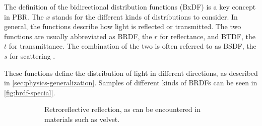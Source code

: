 The definition of the bidirectional distribution functions (\gls{BxDF}) is a key concept in \gls{PBR}. The $x$ stands for the different kinds of distributions to consider. In general, the functions describe how light is reflected or transmitted. The two functions are usually abbreviated as \gls{BRDF}, the $r$ for reflectance, and \gls{BTDF}, the $t$ for transmittance. The combination of the two is often referred to as \gls{BSDF}, the $s$ for scattering \cite{Pharr_Physically_Based_Rendering_2023}.

These functions define the distribution of light in different directions, as described in \autoref{sec:physics-generalization}. Samples of different kinds of \glspl{BRDF} can be seen in \autoref{fig:brdf-special}.

\begin{figure}[H]
  \centering
  \begin{subfigure}[t]{0.45\textwidth}
    \centering
    \caption{Retroreflective reflection, as can be encountered in materials such as velvet.}
    \label{fig:reflectionRetroreflective}
  \end{subfigure}
  \hfill
  \begin{subfigure}[t]{0.45\textwidth}
    \centering
\end{subfigure}
\end{figure}
